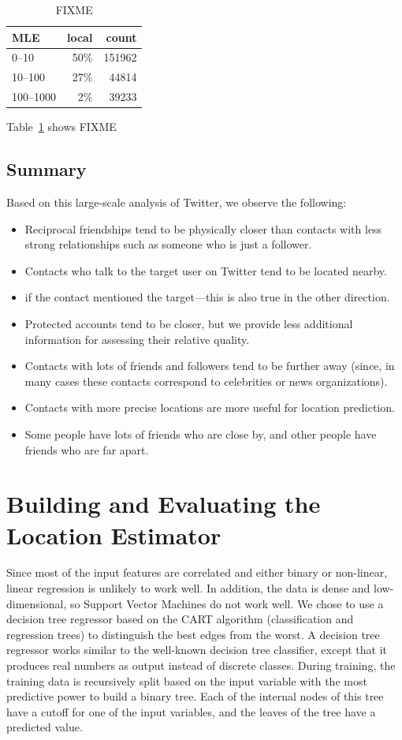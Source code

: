 \documentclass[letterpaper]{article}
\begin{document}
\begin{table}[tbh]
\centering
\begin{tabular}{l r r }
    MLE &local&count\\
    \hline
    0--10 & 50\% & 151962\\
    10--100 & 27\% & 44814\\
    100--1000 & 2\% & 39233\\
\end{tabular}
\caption{
FIXME
}
\label{tab:mle}
\end{table}

Table~\ref{tab:mle} shows FIXME


\subsection{Summary}
Based on this large-scale analysis of Twitter, we observe the following: 

\begin{itemize}
\item Reciprocal friendships tend to be physically closer than contacts with less strong relationships such as someone who is just a follower.
\item Contacts who talk to the target user on Twitter tend to be located nearby.
\item if the contact mentioned the target---this is also true in the other direction.
\item Protected accounts tend to be closer, but we provide less additional information for assessing their relative quality.
\item Contacts with lots of friends and followers tend to be further away (since, in many cases these contacts correspond to celebrities or news organizations).
\item Contacts with more precise locations are more useful for location prediction.
\item Some people have lots of friends who are close by, and other people have friends who are far apart.
\end{itemize}



\section{Building and Evaluating the Location Estimator}

Since most of the input features are correlated and either binary or non-linear,
linear regression is unlikely to work well. In addition, the data is dense and low-dimensional, so Support Vector Machines
do not work well.  We chose to use a decision tree regressor based on the CART algorithm (classification and regression trees) to distinguish the best edges from the worst. A decision tree regressor works similar to the well-known decision tree classifier, except that it produces real numbers as output instead of discrete classes. During training, the training data is recursively split based on the input
variable with the most predictive power to build a binary tree.  Each of the internal nodes of this tree have a cutoff for one of the input
variables, and the leaves of the tree have a predicted value.
\end{document}
